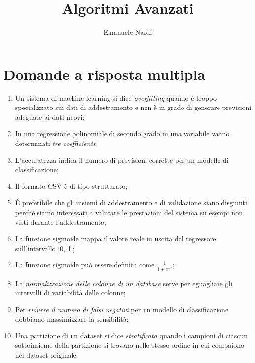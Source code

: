 \documentclass[a4paper]{article}
\title{Algoritmi Avanzati}
\author{Emanuele Nardi}
\begin{document}

\maketitle

\section*{Domande a risposta multipla}

\begin{enumerate}

	\item Un sistema di machine learning si dice \emph{overfitting} quando è troppo specializzato sui dati di addestramento e non è in grado di generare previsioni adeguate ai dati nuovi;

	\item In una regressione polinomiale di secondo grado in una variabile vanno determinati \emph{tre coefficienti};

	\item L’accuratezza indica il numero di previsioni corrette per un modello di classificazione;

	\item Il formato CSV è di tipo strutturato;

	\item \'E preferibile che gli insiemi di addestramento e di validazione siano disgiunti perché siamo interessati a valutare le prestazioni del sistema su esempi non visti durante l’addestramento;

	\item La funzione sigmoide mappa il valore reale in uscita dal regressore sull’intervallo [0, 1];

	\item La funzione sigmoide può essere definita come \( \frac{1}{1 + e^{−t}} \);

	\item La \emph{normalizzazione delle colonne di un database} serve per eguagliare gli intervalli di variabilità delle colonne;

	\item Per \emph{ridurre il numero di falsi negativi} per un modello di classificazione dobbiamo massimizzare la sensibilità;

	\item Una partizione di un dataset si dice \emph{stratificata} quando i campioni di ciascun sottoinsieme della partizione si trovano nello stesso ordine in cui compaiono nel dataset originale;


\end{enumerate}
\end{document}
